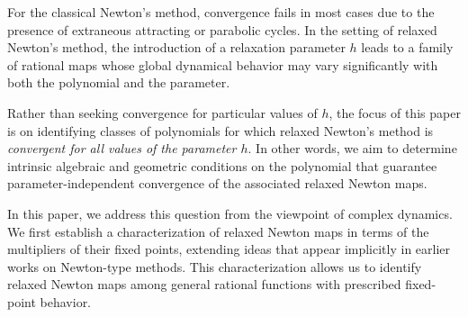 \documentclass[12pt]{article}
\numberwithin{equation}{section}
\begin{document}
For the classical Newton's method, convergence fails in most cases due to the presence of extraneous attracting or parabolic cycles. In the setting of relaxed Newton's method, the introduction of a relaxation parameter $h$ leads to a family of rational maps whose global dynamical behavior may vary significantly with both the polynomial and the parameter.

Rather than seeking convergence for particular values of $h$, the focus of this paper is on identifying classes of polynomials for which relaxed Newton's method is \emph{convergent for all values of the parameter $h$}. In other words, we aim to determine intrinsic algebraic and geometric conditions on the polynomial that guarantee parameter-independent convergence of the associated relaxed Newton maps.

In this paper, we address this question from the viewpoint of complex dynamics.
We first establish a characterization of relaxed Newton maps in terms of the
multipliers of their fixed points, extending ideas that appear implicitly in earlier
works on Newton-type methods. This characterization allows us to identify relaxed
Newton maps among general rational functions with prescribed fixed-point behavior.
\end{document}
